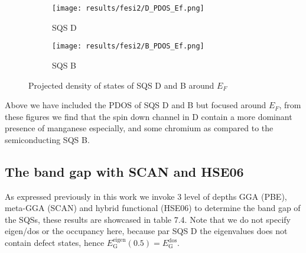   
\begin{figure}[H]
	\centering
	\begin{subfigure}{.45\textwidth}
			\texttt{[image: results/fesi2/D\_PDOS\_Ef.png]}
			\caption{SQS D}		
	\end{subfigure}
	\hspace{0.5cm}
	\begin{subfigure}{.45\textwidth}
		\texttt{[image: results/fesi2/B\_PDOS\_Ef.png]}
		\caption{SQS B}		
	\end{subfigure}
	\caption{Projected density of states of SQS D and B around $E_F$}
\end{figure}

Above we have included the PDOS of SQS D and B but focused around $E_F$, from these figures we find that the spin down channel in D contain a more dominant presence of manganese especially, and some chromium as compared to the semiconducting SQS B.  

\subsection{The band gap with SCAN and HSE06}
As expressed previously in this work we invoke 3 level of depths GGA (PBE), meta-GGA (SCAN) and hybrid functional (HSE06) to determine the band gap of the SQSs, these results are showcased in table 7.4. Note that we do not specify eigen/dos or the occupancy here, because par SQS D the eigenvalues does not contain defect states, hence $E_\text{G} ^\text{eigen}(0.5) = E_\text{G} ^\text{dos}$.

